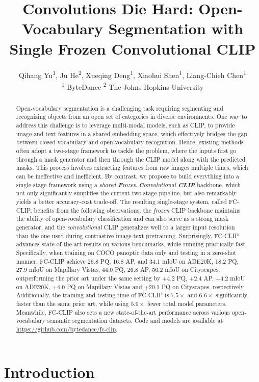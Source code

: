 \documentclass{article}
\title{Convolutions Die Hard: Open-Vocabulary Segmentation with Single Frozen Convolutional CLIP}
\author{Qihang Yu\textsuperscript{1}, Ju He\textsuperscript{2}, Xueqing Deng\textsuperscript{1}, Xiaohui Shen\textsuperscript{1}, Liang-Chieh Chen\textsuperscript{1}\\
  \textsuperscript{1} ByteDance \qquad
   \textsuperscript{2} The Johns Hopkins University
}
\newcommand{\modelname}{FC-CLIP\xspace}
\begin{document}
\maketitle

\begin{abstract}
Open-vocabulary segmentation is a challenging task requiring segmenting and recognizing objects from an open set of categories in diverse environments.
One way to address this challenge is to leverage multi-modal models, such as CLIP, to provide image and text features in a shared embedding space, which effectively bridges the gap between closed-vocabulary and open-vocabulary recognition.
Hence, existing methods often adopt a two-stage framework to tackle the problem, where the inputs first go through a mask generator and then through the CLIP model along with the predicted masks.
This process involves extracting features from raw images multiple times, which can be ineffective and inefficient.
By contrast, we propose to build everything into a single-stage framework using a \textit{shared \textbf{F}rozen \textbf{C}onvolutional \textbf{CLIP}} backbone, which not only significantly simplifies the current two-stage pipeline, but also remarkably yields a better accuracy-cost trade-off.
The resulting single-stage system, called \modelname, benefits from the following observations: the \textit{frozen} CLIP backbone maintains the ability of open-vocabulary classification and can also serve as a strong mask generator, and the \textit{convolutional} CLIP generalizes well to a larger input resolution than the one used during contrastive image-text pretraining.
Surprisingly, \modelname advances state-of-the-art results on various benchmarks, while running practically fast.
Specifically, when training on COCO panoptic data only and testing in a zero-shot manner, \modelname achieve 26.8 PQ, 16.8 AP, and 34.1 mIoU on ADE20K, 18.2 PQ, 27.9 mIoU on Mapillary Vistas, 44.0 PQ, 26.8 AP, 56.2 mIoU on Cityscapes, outperforming the prior art under the same setting by +4.2 PQ, +2.4 AP, +4.2 mIoU on ADE20K, +4.0 PQ on Mapillary Vistas and +20.1 PQ on Cityscapes, respectively.
Additionally, the training and testing time of \modelname is $7.5\times$ and $6.6\times$ 
 significantly faster than the same prior art, while using $5.9\times$ fewer total model parameters.
Meanwhile, \modelname also sets a new state-of-the-art performance across various open-vocabulary semantic segmentation datasets.
Code and models are available at \url{https://github.com/bytedance/fc-clip}.
\end{abstract} \section{Introduction}
\label{Introduction}
\end{document}
